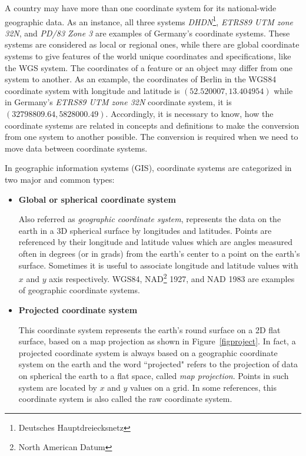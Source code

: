 \documentclass[a4paper,12pt]{article}
\begin{document}
A country may have more than one coordinate system for its national-wide geographic data. As an instance, all three systems \textit{DHDN}\footnote{Deutsches Hauptdreiecksnetz}, \textit{ETRS89 UTM zone 32N}, and \textit{PD/83 Zone 3} are examples of Germany's coordinate systems. These systems are considered as local or regional ones, while there are global coordinate systems to give features of the world unique coordinates and specifications, like the WGS system. The coordinates of a feature or an object may differ from one system to another. As an example, the coordinates of Berlin in the WGS84 coordinate system with longitude and latitude is $(52.520007, 13.404954)$ while in Germany's \textit{ETRS89 UTM zone 32N} coordinate system, it is $(32798809.64, 5828000.49)$. Accordingly, it is necessary to know, how the coordinate systems are related in concepts and definitions to make the conversion from one system to another possible. The conversion is required when we need to move data between coordinate systems.

  
In geographic information systems (GIS), coordinate systems are categorized in two major and common types:
\begin{itemize}
\item \textbf{Global or spherical coordinate system} 

Also referred as \textit{geographic coordinate system}, represents the data on the earth in a 3D spherical surface by longitudes and latitudes. Points are referenced by their longitude and latitude values which are angles measured often in degrees (or in grads) from the earth's center to a point on the earth's surface. Sometimes it is useful to associate longitude and latitude values with $x$ and $y$ axis respectively. WGS84, NAD\footnote{North American Datum} 1927, and NAD 1983 are examples of geographic coordinate systems. 

\item \textbf{Projected coordinate system} 

This coordinate system represents the earth's round surface on a 2D flat surface, based on a map projection as shown in Figure~\ref{figproject}. In fact, a projected coordinate system is always based on a geographic coordinate system on the earth and the word ``projected" refers to the projection of data on spherical the earth to a flat space, called \textit{map projection}. Points in such system are located by $x$ and $y$ values on a grid. 
In some references, this coordinate system is also called the raw coordinate system.
\end{itemize}
\end{document}
